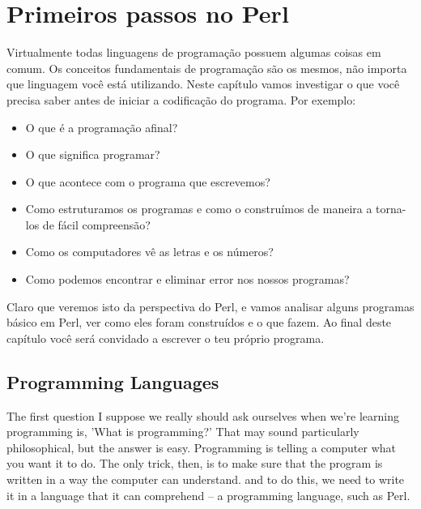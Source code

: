 \documentclass[a4paper,11pt]{book}
\begin{document}
\chapter{Primeiros passos no Perl}

\noindent Virtualmente todas linguagens de programa\c{c}\~ao possuem algumas coisas em comum. Os conceitos fundamentais de programa\c{c}\~ao s\~ao os mesmos, n\~ao importa que linguagem voc\^e est\'a utilizando. Neste cap\'itulo vamos investigar o que voc\^e precisa saber antes de iniciar a codifica\c{c}\~ao do programa. Por exemplo:

\begin{itemize}

 \item O que \'e a programa\c{c}\~ao afinal? 

 \item O que significa programar?

 \item O que acontece com o programa que escrevemos?

 \item Como estruturamos os programas e como o constru\'imos de maneira a torna-los de f\'acil compreens\~ao?

 \item Como os computadores v\^e as letras e os n\'umeros?

 \item Como podemos encontrar e eliminar error nos nossos programas? 

\end{itemize}

\noindent Claro que veremos isto da perspectiva do Perl, e vamos analisar alguns programas b\'asico em Perl, ver como eles foram constru\'idos e o que fazem. Ao final deste cap\'itulo você ser\'a convidado a escrever o teu pr\'oprio programa.

\section{Programming Languages}

\noindent 

\noindent The first question I suppose we really should ask ourselves when we're learning programming is, 'What is programming?' That may sound particularly philosophical, but the answer is easy. Programming is telling a computer what you want it to do. The only trick, then, is to make sure that the program is written in a way the computer can understand. and to do this, we need to write it in a language that it can comprehend -- a programming language, such as Perl.
\end{document}
